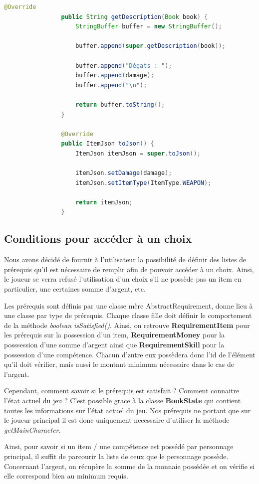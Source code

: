 			\begin{lstlisting}[gobble=16, language=Java, caption=Exemple de spécialisation des items]
				@Override
				public String getDescription(Book book) {
					StringBuffer buffer = new StringBuffer();

					buffer.append(super.getDescription(book));

					buffer.append("Dégats : ");
					buffer.append(damage);
					buffer.append("\n");

					return buffer.toString();
				}

				@Override
				public ItemJson toJson() {
					ItemJson itemJson = super.toJson();

					itemJson.setDamage(damage);
					itemJson.setItemType(ItemType.WEAPON);

					return itemJson;
				}
			\end{lstlisting}

		\subsection{Conditions pour accéder à un choix}

			Nous avons décidé de fournir à l'utilisateur la possibilité de définir des listes de prérequis qu'il est nécessaire de remplir afin de pouvoir accéder à un choix. Ainsi, le joueur se verra refusé l'utilisation d'un choix s'il ne possède pas un item en particulier, une certaines somme d'argent, etc.

			Les prérequis sont définis par une classe mère AbstractRequirement, donne lieu à une classe par type de prérequis. Chaque classe fille doit définir le comportement de la méthode \textit{boolean isSatisfied()}. Ainsi, on retrouve \textbf{RequirementItem} pour les prérequis sur la possession d'un item, \textbf{RequirementMoney} pour la posssession d'une somme d'argent ainsi que \textbf{RequirementSkill} pour la possession d'une compétence. Chacun d'zntre eux possèdera donc l'id de l'élément qu'il doit vérifier, mais aussi le montant minimum nécessaire dans le cas de l'argent.

			Cependant, comment savoir si le prérequis est satisfait ? Comment connaitre l'état actuel du jeu ? C'est possible grace à la classe \textbf{BookState} qui contient toutes les informations sur l'état actuel du jeu. Nos prérequis ne portant que sur le joueur principal il est donc uniquement necessaire d'utiliser la méthode \textit{getMainCharacter}.

			Ainsi, pour savoir si un item / une compétence est possédé par personnage principal, il suffit de parcourir la liste de ceux que le personnage possède. Concernant l'argent, on récupère la somme de la monnaie possédée et on vérifie si elle correspond bien au minimum requis.

